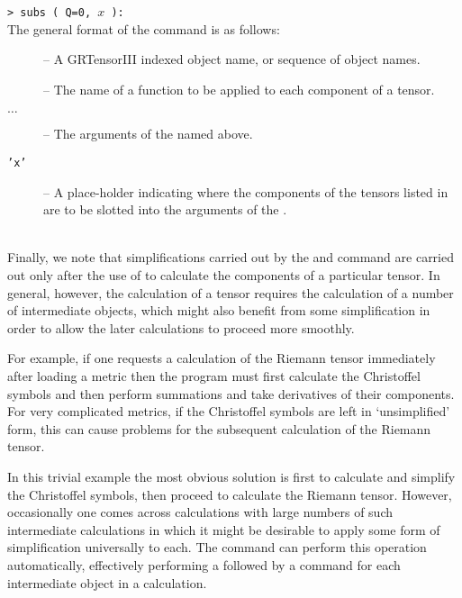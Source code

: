\documentclass{article}
\begin{document}
{{{\noindent\texttt{> subs ( Q=0, $x$ ):}\\

\noindent The general format of the  command is as follows:\\
%
\begin{cmdspec}
  \label{spec:grmap}

  \begin{description}
    \item[] -- A GRTensorIII indexed object name, or sequence 
      of object names.
    \item[] -- The name of a function to be applied to each
      component of a tensor.
    \item[ $\ldots$ ] -- The arguments of the
       named above.
    \item[\texttt{'x'}] -- A place-holder indicating where the components
      of the tensors listed in  are to be slotted into
      the arguments of the .
  \end{description}

\end{cmdspec}\\[\baselineskip]

Finally, we note that simplifications carried out by the
 and  command are carried out only after
the use of  to calculate the components of a particular
tensor. In general, however, the calculation of a tensor requires the
calculation of a number of intermediate objects, which might also
benefit from some simplification in order to allow the later
calculations to proceed more smoothly.

For example, if one requests a calculation of the Riemann tensor
immediately after loading a metric then the program must first
calculate the Christoffel symbols and then perform summations and take
derivatives of their components. For very complicated metrics, if the
Christoffel symbols are left in `unsimplified' form, this can cause
problems for the subsequent calculation of the Riemann tensor.

In this trivial example the most obvious solution is first to
calculate and simplify the Christoffel symbols, then proceed to
calculate the Riemann tensor. However, occasionally one comes across
calculations with large numbers of such intermediate calculations in
which it might be desirable to apply some form of simplification
universally to each. The  command can perform this
operation automatically, effectively performing a 
followed by a  command for each intermediate object in
a calculation.\\
%
\begin{cmdspec}
  \label{spec:grcalcalter}


\end{cmdspec}}}}
\end{document}
